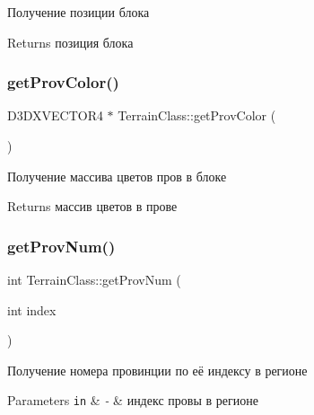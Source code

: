 Получение позиции блока 

\begin{DoxyReturn}{Returns}
позиция блока 
\end{DoxyReturn}
\mbox{\label{class_terrain_class_afe6b61761f91099e2d69e1681712eded}} 
\subsubsection{\texorpdfstring{get\+Prov\+Color()}{getProvColor()}}
{\footnotesize\ttfamily D3\+D\+X\+V\+E\+C\+T\+O\+R4 $\ast$ Terrain\+Class\+::get\+Prov\+Color (\begin{DoxyParamCaption}{ }\end{DoxyParamCaption})\hspace{0.3cm}{\ttfamily [private]}}



Получение массива цветов пров в блоке 

\begin{DoxyReturn}{Returns}
массив цветов в прове 
\end{DoxyReturn}
\mbox{\label{class_terrain_class_a47058be498196233e4ff49addad81c24}} 
\subsubsection{\texorpdfstring{get\+Prov\+Num()}{getProvNum()}}
{\footnotesize\ttfamily int Terrain\+Class\+::get\+Prov\+Num (\begin{DoxyParamCaption}\item[{int}]{index }\end{DoxyParamCaption})\hspace{0.3cm}{\ttfamily [private]}}



Получение номера провинции по её индексу в регионе 


\begin{DoxyParams}[1]{Parameters}
\mbox{\tt in}  & {\em -\/} & индекс провы в регионе \\
\hline
\end{DoxyParams}
\mbox{\label{class_terrain_class_a09e3bc6e0936bd3179cca06ea8338558}} 
